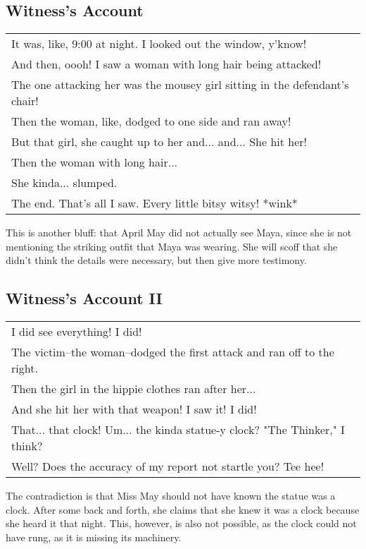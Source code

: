 \subsection{Witness's Account}
\begin{tabular}{p{11cm}}
It was, like, 9:00 at night. I looked out the window, y'know! \\
And then, oooh! I saw a woman with long hair being attacked!\\
The one attacking her was the mousey girl sitting in the defendant's chair!\\
Then the woman, like, dodged to one side and ran away!\\
But that girl, she caught up to her and... and... She hit her!\\
Then the woman with long hair...\\
She kinda... slumped.\\
The end. That's all I saw. Every little bitsy witsy! *wink* \\
\end{tabular}

This is another bluff: that April May did not actually see Maya, since she is not mentioning the striking outfit that Maya was wearing. She will scoff that she didn't think the details were necessary, but then give more testimony.

\subsection{Witness's Account II}
\begin{tabular}{p{11cm}}
I did see everything! I did! \\
The victim--the woman--dodged the first attack and ran off to the right.\\
Then the girl in the hippie clothes ran after her...\\
And she hit her with that weapon! I saw it! I did!\\
That... that clock! Um... the kinda statue-y clock? "The Thinker," I think?\\
Well? Does the accuracy of my report not startle you? Tee hee! \end{tabular}

The contradiction is that Miss May should not have known the statue was a clock. After some back and forth, she claims that she knew it was a clock because she heard it that night. This, however, is also not possible, as the clock could not have rung, as it is missing its machinery.

